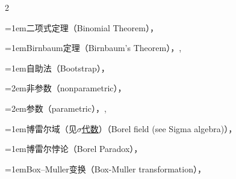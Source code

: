 \begin{multicols}{2}
\par\addvspace{2pt}
\par\noindent\hangindent=1em\hspace*{0em}\label{idx:92}二项式定理（Binomial Theorem），\hyperref[thm:3.2.2]{\pageref*{thm:3.2.2}}\par
\par\addvspace{2pt}
\par\noindent\hangindent=1em\hspace*{0em}\label{idx:93}Birnbaum定理（Birnbaum’s Theorem），\hyperref[thm:6.3.6]{\pageref*{thm:6.3.6}}, \hyperref[exercise:6.33]{\pageref*{exercise:6.33}}\par
\par\addvspace{2pt}
\par\noindent\hangindent=1em\hspace*{0em}\label{idx:94}自助法（Bootstrap），\hyperref[sec:10.1.4]{\pageref*{sec:10.1.4}}\par
\par\noindent\hangindent=2em\hspace*{1em}\label{idx:95}非参数（nonparametric），\hyperref[ex:10.1.19]{\pageref*{ex:10.1.19}}\par
\par\noindent\hangindent=2em\hspace*{1em}\label{idx:96}参数（parametric），\hyperref[ex:5.6.6]{\pageref*{ex:5.6.6}}, \hyperref[idxocc:96:418]{\pageref*{idxocc:96:418}}\par
\par\addvspace{2pt}
\par\noindent\hangindent=1em\hspace*{0em}\label{idx:97}博雷尔域（见\hyperref[idx:972]{\ensuremath{\sigma}代数}）（Borel field (see Sigma algebra)），\hyperref[def:1.2.1]{\pageref*{def:1.2.1}}\par
\par\addvspace{2pt}
\par\noindent\hangindent=1em\hspace*{0em}\label{idx:98}博雷尔悖论（Borel Paradox），\hyperref[sec:4.9.3]{\pageref*{sec:4.9.3}}\par
\par\addvspace{2pt}
\par\noindent\hangindent=1em\hspace*{0em}\label{idx:99}Box–Muller变换（Box-Muller transformation），\hyperref[ex:5.6.4]{\pageref*{ex:5.6.4}}\par

\end{multicols}
